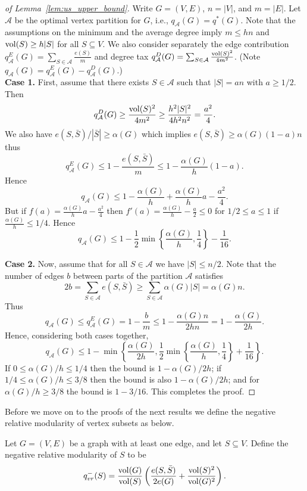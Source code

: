 \documentclass[runningheads, envcountsame, smallextended]{llncs}
\newcommand{\vol}{{\rm vol}}
\newcommand{\cA}{{\mathcal A}}
\numberwithin{theorem}{section}
\numberwithin{definition}{section}
\numberwithin{lemma}{section}
\numberwithin{corollary}{section}
\numberwithin{proposition}{section}
\numberwithin{conjecture}{section}
\numberwithin{remark}{section}
\numberwithin{equation}{section}
\begin{document}
\begin{proof}[of Lemma~\ref{lem:us_upper_bound}]
    Write $G=(V,E)$, $n=|V|$, and $m=|E|$. Let $\cA$ be the optimal vertex partition for $G$, i.e., $q_{\cA}(G) = q^*(G)$. Note that the assumptions on the minimum and the average degree imply $m \leq hn$ and $\vol(S) \geq h|S|$ for all $S \subseteq V$. We also consider separately the edge contribution $q_{\cA}^E(G) = \sum_{S \in \cA} \frac{e(S)}{m}$ and degree tax $q_{\cA}^D(G) = \sum_{S \in \cA} \frac{\vol(S)^2}{4 m^2}$. (Note $q_{\cA}(G) = q_{\cA}^E(G) - q_{\cA}^D(G)$.) \\
	
	\noindent\textbf{Case 1.} First, assume that there exists $S \in \cA$ such that $|S| = an$ with $a \geq 1/2$. Then
	\[
	q_{\cA}^D(G) \geq \frac{\vol(S)^2}{4 m^2} \geq \frac{h^2 |S|^2}{4h^2n^2} = \frac{a^2}{4}.
	\]
	We also have %
    $e(S,\bar{S})/|\bar{S}| \geq \alpha(G)$ 
    which implies $e(S,\bar{S}) \geq \alpha(G)(1-a)n$ thus
	\[
	q_{\cA}^E(G) \leq 1 - \frac{e(S,\bar{S})}{m} \leq 1 - \frac{\alpha(G)}{h}(1-a).
	\]
	Hence
	\[
	q_{\cA}(G) \leq 1 - \frac{\alpha(G)}{h} + \frac{\alpha(G)}{h}a -  \frac{a^2}{4}.
	\]
	But if $f(a) = \frac{\alpha(G)}{h}a -  \frac{a^2}{4}$ then $f'(a) = \frac{\alpha(G)}{h} -\frac{a}{2} \leq 0$ for $1/2 \leq a \leq 1$ if $\frac{\alpha(G)}{h} \leq 1/4$. Hence
	\[
	q_{\cA}(G) \leq 1-\frac12\min\left\{\frac{\alpha(G)}{h}, \frac{1}{4}\right\} - \frac{1}{16}.
	\]
	
	\noindent\textbf{Case 2.} Now, assume that for all $S \in \cA$ we have $|S| \leq n/2$.
	Note that the number of edges $b$ between parts of the partition $\cA$ satisfies 
	\[  2 b=\sum_{S \in \cA} e(S, \bar{S}) \geq \sum_{S \in \cA} \alpha(G) |S| = \alpha(G) n. \]
	Thus 
	\[
    q_{\cA}(G) \leq q^E_{\cA}(G)  = 1-\frac{b}{m} \leq 1 - \frac{\alpha(G) n}{2hn} = 1 - \frac{\alpha(G)}{2h}.
    \] 	
	Hence, considering both cases together,
	\[
	q_\cA(G) \leq 1- \min\left\{ \frac{\alpha(G)}{2 h}, \frac{1}{2} \min\left\{\frac{\alpha(G)}{h}, \frac{1}{4}\right\} + \frac{1}{16}\right\}.\]
	If $0 \leq \alpha(G)/h \leq 1/4$ then the bound is
	$1-\alpha(G)/2h$;
	if $1/4 \leq \alpha(G)/h \leq 3/8$ then the bound is also $1-\alpha(G)/2h$; and for $\alpha(G)/h \geq 3/8$ the bound is $1-3/16$.  This completes the proof.
\end{proof}


Before we move on to the proofs of the next results we define the negative relative modularity of vertex subsets as below.
%
\begin{definition}\label{defn.neg_mod}
	Let $G=(V,E)$ be a graph with at least one edge, and let $S \subseteq V$.	Define the negative relative modularity of $S$ to be 
	\[
	q_{vr}^{-}(S) = \frac{\vol(G)}{\vol(S)}\left(\frac{ e(S,\bar{S})}{2e(G)}+\frac{\vol(S)^2}{\vol(G)^2}\right). 
	\]
\end{definition}
\end{document}
